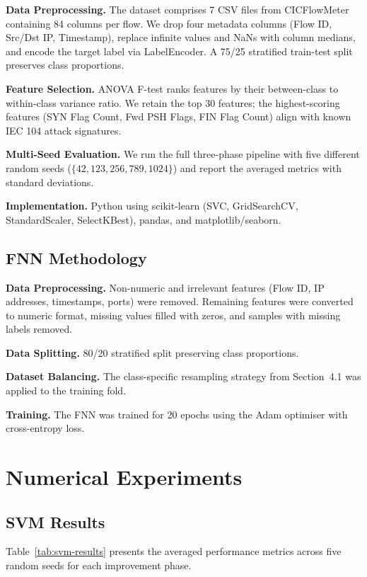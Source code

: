 \documentclass{article}
\begin{document}
\textbf{Data Preprocessing.} The dataset comprises 7 CSV files from CICFlowMeter containing 84 columns per flow. We drop four metadata columns (Flow ID, Src/Dst IP, Timestamp), replace infinite values and NaNs with column medians, and encode the target label via LabelEncoder. A 75/25 stratified train-test split preserves class proportions.

\textbf{Feature Selection.} ANOVA F-test ranks features by their between-class to within-class variance ratio. We retain the top 30 features; the highest-scoring features (SYN Flag Count, Fwd PSH Flags, FIN Flag Count) align with known IEC 104 attack signatures.

\textbf{Multi-Seed Evaluation.} We run the full three-phase pipeline with five different random seeds ($\{42, 123, 256, 789, 1024\}$) and report the averaged metrics with standard deviations.

\textbf{Implementation.} Python using scikit-learn (SVC, GridSearchCV, StandardScaler, SelectKBest), pandas, and matplotlib/seaborn.

\subsection{FNN Methodology}

\textbf{Data Preprocessing.} Non-numeric and irrelevant features (Flow ID, IP addresses, timestamps, ports) were removed. Remaining features were converted to numeric format, missing values filled with zeros, and samples with missing labels removed.

\textbf{Data Splitting.} 80/20 stratified split preserving class proportions.

\textbf{Dataset Balancing.} The class-specific resampling strategy from Section~4.1 was applied to the training fold.

\textbf{Training.} The FNN was trained for 20 epochs using the Adam optimiser with cross-entropy loss.

\section{Numerical Experiments}

\subsection{SVM Results}

Table~\ref{tab:svm-results} presents the averaged performance metrics across five random seeds for each improvement phase.
\end{document}

